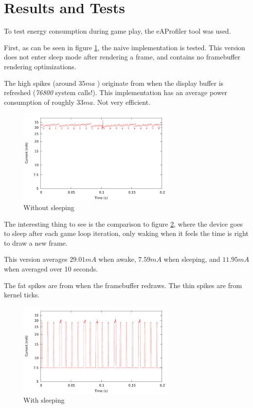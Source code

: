 \section{Results and Tests}
To test energy consumption during game play, the eAProfiler tool was used.

First, as can be seen in figure \ref{fig:nosleep},
the naive implementation is tested.
This version does not enter sleep mode after rendering a frame,
and contains no framebuffer rendering optimizations.

The high spikes (around $ 35 ma $ ) originate from when the display buffer is
refreshed (\emph{76800} system calls!). This implementation has an average
power consumption of roughly $ 33 ma $. Not very efficient.

\begin{figure}[H]
\centering
\includegraphics[width=0.7\textwidth]{figures/nosleep.pdf}
\caption{Without sleeping}
\label{fig:nosleep}
\end{figure}

The interesting thing to see is the comparison to figure
\ref{fig:sleep}, where the device goes to sleep after each
game loop iteration, only waking when it feels the time is
right to draw a new frame.

This version averages $ 29.01 mA $ when awake,
$ 7.59 mA $ when sleeping,
and $ 11.95 mA $ when averaged over 10 seconds.

The fat spikes are from when the framebuffer redraws.
The thin spikes are from kernel ticks.

\begin{figure}[H]
\centering
\includegraphics[width=0.7\textwidth]{figures/sleep.pdf}
\caption{With sleeping}
\label{fig:sleep}
\end{figure}


